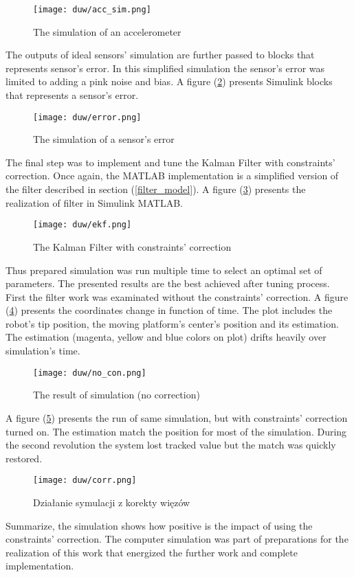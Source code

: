 \begin{figure}[!h]
	\centering
	\texttt{[image: duw/acc\_sim.png]}
	\caption{The simulation of an accelerometer}
	\label{acc_sym}
\end{figure}

The outputs of ideal sensors' simulation are further passed to blocks that represents sensor's error. In this simplified simulation the sensor's error was limited to adding a pink noise and bias. A figure (\ref{error_sensor}) presents Simulink blocks that represents a sensor's error.

\begin{figure}[!h]
	\centering
	\texttt{[image: duw/error.png]}
	\caption{The simulation of a sensor's error}
	\label{error_sensor}
\end{figure}

The final step was to implement and tune the Kalman Filter with constraints' correction. Once again, the MATLAB implementation is a simplified version of the filter described in section (\ref{filter_model}). A figure (\ref{ekf_sim}) presents the realization of filter in Simulink MATLAB.

\begin{figure}[!h]
	\centering
	\texttt{[image: duw/ekf.png]}
	\caption{The Kalman Filter with constraints' correction}
	\label{ekf_sim}
\end{figure}

Thus prepared simulation was run multiple time to select an optimal set of parameters. The presented results are the best achieved after tuning process. First the filter work was examinated without the constraints' correction. A figure (\ref{no_con}) presents the coordinates change in function of time. The plot includes the robot's tip position, the moving platform's center's position and its estimation. The estimation (magenta, yellow and blue colors on plot) drifts heavily over simulation's time.

\begin{figure}[!h]
	\centering
	\texttt{[image: duw/no\_con.png]}
	\caption{The result of simulation (no correction)}
	\label{no_con}
\end{figure}

A figure (\ref{corr}) presents the run of same simulation, but with constraints' correction turned on. 
The estimation match the position for most of the simulation. During the second revolution the system lost tracked value but the match was quickly restored.

\begin{figure}[!h]
	\centering
	\texttt{[image: duw/corr.png]}
	\caption{Działanie symulacji z korekty więzów}
	\label{corr}
\end{figure}

\newpage
Summarize, the simulation shows how positive is the impact of using the constraints' correction. The computer simulation was part of preparations for the realization of this work that energized the further work and complete implementation.